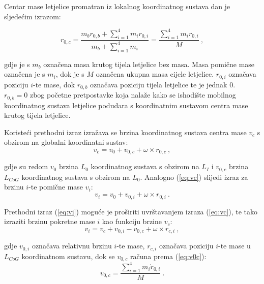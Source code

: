 \documentclass[11pt,a4paper]{article}
\begin{document}
\medskip

Centar mase letjelice promatran iz lokalnog koordinatnog sustava dan je sljedećim izrazom:

\begin{equation}
 {r}_{0,c} = \frac{ {m}_{b} {r}_{0,b} + \sum_{i=1}^{4}{m}_{i} {r}_{0,i}}{{m}_{b} + \sum_{i=1}^{4} {m}_{i}} = \frac{\sum_{i=1}^{4} {m}_{i} {r}_{0,i}}{ {M}} \ , 
\label{eq:r0c}
\end{equation}

\medskip

gdje je s $m_{b}$ označena masa krutog tijela letjelice bez masa. Masa pomične mase označena je s $m_{i}$, dok je s $M$ označena ukupna masa cijele letjelice. $r_{0,i}$ označava poziciju $i$-te mase, dok $r_{0,b}$ označava poziciju tijela letjelice te je jednak 0. $r_{0,b} = 0$ zbog početne pretpostavke koja nalaže kako se ishodište mobilnog koordinatnog sustava letjelice podudara s koordinatnim sustavom centra mase krutog tijela letjelice. 

\medskip

Koristeći prethodni izraz izražava se brzina koordinatnog sustava centra mase $v_{c}$ s obzirom na globalni koordinatni sustav:
\begin{equation}
 {v_{c} = v_{0} + v_{0,c} + \omega \times r_{0,c}} \ , 
\label{eq:vc}
\end{equation}

gdje su redom $v_{0}$ brzina $L_{0}$ koordinatnog sustava s obzirom na $L_{I}$ i $v_{0,c}$ brzina $L_{CoG}$ koordinatnog sustava s obzirom na $L_{0}$. Analogno (\ref{eq:vc}) slijedi izraz za brzinu $i$-te pomične mase $v_{i}$:
\begin{equation}
 {v_{i} = v_{0} + v_{0,i} + \omega \times r_{0,i}} \ . 
\label{eq:vi}
\end{equation}

Prethodni izraz (\ref{eq:vi}) moguće je proširiti uvrštavanjem izraza (\ref{eq:vc}), te tako izraziti brzinu pokretne mase $i$ kao funkciju brzine $v_{c}$: 
\begin{equation}
 {v_{i} = v_{c} + v_{0,i} - v_{0,c} + \omega \times r_{c,i}} \ ,
\label{eq:vi2}
\end{equation}

gdje $v_{0,i}$ označava relativnu brzinu $i$-te mase, $r_{c,i}$ označava poziciju $i$-te mase u $L_{CoG}$ koordinatnom sustavu, dok se $v_{0,c}$ računa prema (\ref{eq:v0c}):
\begin{equation}
 {v_{0,c} = \frac{\sum_{i=1}^{4}m_{i}\dot{r}_{0,i}}{M}} \ .
\label{eq:v0c}
\end{equation}
\end{document}
